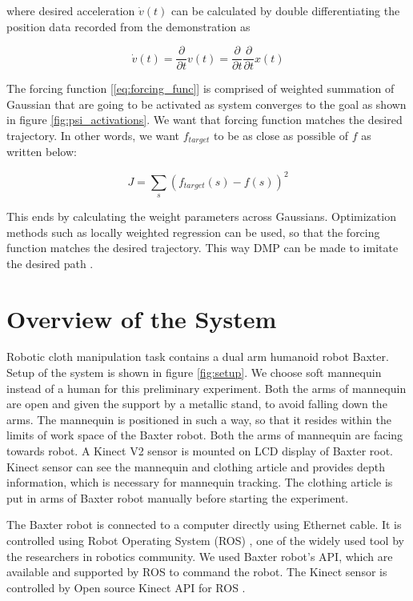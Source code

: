 \documentclass[sigconf]{acmart}
\begin{document}
where desired acceleration $\dot{v}(t)$ can be calculated by double differentiating the position data recorded from the demonstration as

\begin{equation}
	\dot{v}(t) = \frac{\partial}{\partial t} v(t) = \frac{\partial}{\partial t} \frac{\partial}{\partial t} x(t)
\end{equation}

The forcing function [\ref{eq:forcing_func}] is comprised of weighted summation of Gaussian that are going to be activated as system converges to the goal as shown in figure \ref{fig:psi_activations}. We want that forcing function matches the desired trajectory. In other words, we want $f_{target}$ to be as close as possible of $f$ as written below:

\begin{equation}
	J = \sum_{s} \left( f_{target}(s) - f(s) \right)^2
\end{equation}

This ends by calculating the weight parameters across Gaussians. Optimization methods such as locally weighted regression \cite{vijayakumar2000locally} can be used, so that the forcing function matches the desired trajectory. This way DMP can be made to imitate the desired path \cite{pastor2009learning}.

\section{Overview of the System}
\label{sec:system_overview}
Robotic cloth manipulation task contains a dual arm humanoid robot Baxter. Setup of the system is shown in figure \ref{fig:setup}. We choose soft mannequin instead of a human for this preliminary experiment. Both the arms of mannequin are open and  given the support by a metallic stand, to avoid falling down the arms. The mannequin is positioned in such a way, so that it resides within the limits of work space of the Baxter robot. Both the arms of mannequin are facing towards robot. A Kinect V2 \cite{microsoft2014kinect} sensor is mounted on LCD display of Baxter root. Kinect sensor can see the mannequin and clothing article and provides depth information, which is necessary for mannequin tracking. The clothing article is put in arms of Baxter robot manually before starting the experiment.

The Baxter robot is connected to a computer directly using Ethernet cable. It is controlled using Robot Operating System (ROS) \cite{quigley2009ros}, one of the widely used tool by the researchers in robotics community. We used Baxter robot's API, which are available and supported by ROS to command the robot. The Kinect sensor is controlled by Open source Kinect API for ROS \cite{iai_kinect2, libfreenect2}.
\end{document}
